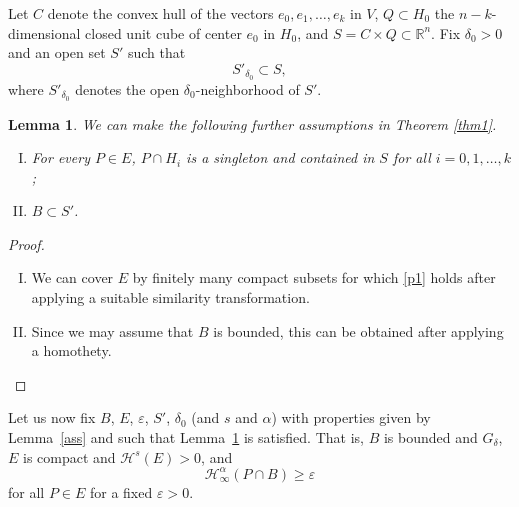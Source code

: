 \documentclass[a4paper]{amsart}
\newtheorem{lemma}[theorem]{Lemma}
\theoremstyle{definition} \newtheorem{remark}[theorem]{Remark}
\def\rr{{\mathbb R}}
\def\su{\subset}
\def\al{\alpha}
\def\de{\delta}
\def\ep{\varepsilon}
\def\hau{\mathcal{H}}
\begin{document}
Let $C$ denote the convex hull of the vectors $e_0, e_1,\dots,e_k$ in $V$, $Q \su H_0$ the 
$n-k$-dimensional closed unit cube of center $e_0$ in $H_0$, and $S= C \times Q \su \rr^n$. 
Fix $\de_0>0$ and an open set $S'$ such that 
\begin{equation}
\label{sub}
S'_{\de_0} \subset S,
\end{equation}
 where $S'_{\de_0}$ denotes the open $\de_0$-neighborhood of $S'$.

\begin{lemma}\label{ci}
We can make the following further assumptions in Theorem \ref{thm1}.
\begin{enumerate}[(I)]
\item\label{p1} For every $P\in E$, $P \cap H_i$ is a singleton and contained in $S$ for all $i=0,1,\dots,k$;
\item \label{p3}   $B\subset S'$.
\end{enumerate}
\end{lemma}
\begin{proof} \ 
\begin{enumerate}[(I)]
\item We can cover $E$ by finitely many compact subsets for which \eqref{p1} holds after applying a suitable similarity transformation.
\item Since we may assume that $B$ is bounded, this can be obtained after applying a homothety.
\end{enumerate}
\end{proof}

Let us now fix $B$, $E$, $\ep$, $S'$, $\delta_0$ (and $s$ and $\alpha$) with properties given by Lemma~\ref{ass} and such that Lemma~\ref{ci} is satisfied. That is, $B$ is bounded and $G_\delta$, $E$ is compact and $\hau^s(E)>0$, and
\begin{equation}\label{a1}
\hau^{\al}_{\infty}(P \cap B) \geq \ep
\end{equation}
for all $P \in E$ for a fixed $\ep>0$.
\end{document}
